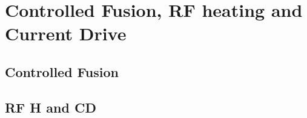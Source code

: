 
\chapter{Controlled Fusion, RF heating and Current Drive}
\section{Controlled Fusion}

\section{RF H and CD}
